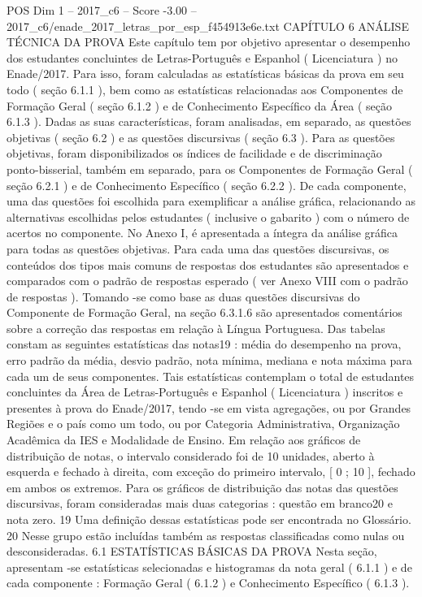 \begin{textsample}{POS Dim 1 – 2017\_c6 – Score -3.00 – 2017\_c6/enade\_2017\_letras\_por\_esp\_f454913e6e.txt}  \label{ex:f1_pos_299}
CAPÍTULO 6 ANÁLISE TÉCNICA DA PROVA Este capítulo tem por objetivo apresentar o desempenho dos estudantes concluintes de Letras-Português e Espanhol ( Licenciatura ) no Enade/2017.
Para isso, foram calculadas as estatísticas básicas da prova em seu todo ( seção 6.1.1 ), bem como as estatísticas relacionadas aos Componentes de Formação Geral ( seção 6.1.2 ) e de Conhecimento Específico da Área ( seção 6.1.3 ).
Dadas as suas características, foram analisadas, em separado, as questões objetivas ( seção 6.2 ) e as questões discursivas ( seção 6.3 ).
Para as questões objetivas, foram disponibilizados os índices de facilidade e de discriminação ponto-bisserial, também em separado, para os Componentes de Formação Geral ( seção 6.2.1 ) e de Conhecimento Específico ( seção 6.2.2 ).
De cada componente, uma das questões foi escolhida para exemplificar a análise gráfica, relacionando as alternativas escolhidas pelos estudantes ( inclusive o gabarito ) com o número de acertos no componente.
No Anexo I, é apresentada a íntegra da análise gráfica para todas as questões objetivas.
Para cada uma das questões discursivas, os conteúdos dos tipos mais comuns de respostas dos estudantes são apresentados e comparados com o padrão de respostas esperado ( ver Anexo VIII com o padrão de respostas ).
Tomando -se como base as duas questões discursivas do Componente de Formação Geral, na seção 6.3.1.6 são apresentados comentários sobre a correção das respostas em relação à Língua Portuguesa.
Das tabelas constam as seguintes estatísticas das notas19 : média do desempenho na prova, erro padrão da média, desvio padrão, nota mínima, mediana e nota máxima para cada um de seus componentes.
Tais estatísticas contemplam o total de estudantes concluintes da Área de Letras-Português e Espanhol ( Licenciatura ) inscritos e presentes à prova do Enade/2017, tendo -se em vista agregações, ou por Grandes Regiões e o país como um todo, ou por Categoria Administrativa, Organização Acadêmica da IES e Modalidade de Ensino.
Em relação aos gráficos de distribuição de notas, o intervalo considerado foi de 10 unidades, aberto à esquerda e fechado à direita, com exceção do primeiro intervalo, [ 0 ; 10 ], fechado em ambos os extremos.
Para os gráficos de distribuição das notas das questões discursivas, foram consideradas mais duas categorias : questão em branco20 e nota zero. 19 Uma definição dessas estatísticas pode ser encontrada no Glossário. 20 Nesse grupo estão incluídas também as respostas classificadas como nulas ou desconsideradas. 6.1 ESTATÍSTICAS BÁSICAS DA PROVA Nesta seção, apresentam -se estatísticas selecionadas e histogramas da nota geral ( 6.1.1 ) e de cada componente : Formação Geral ( 6.1.2 ) e Conhecimento Específico ( 6.1.3 ).

\end{textsample}
